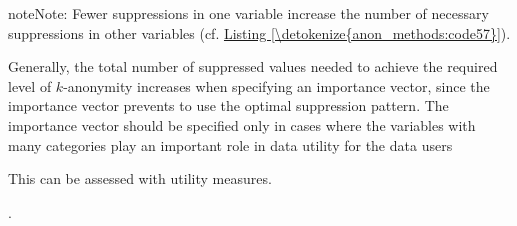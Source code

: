\documentclass[letterpaper,10pt,english]{sphinxmanual}
\begin{document}
\begin{sphinxadmonition}{note}{Note:}
Fewer suppressions in one variable increase the number of necessary
suppressions in other variables (cf. \hyperref[\detokenize{anon_methods:code57}]{Listing \ref{\detokenize{anon_methods:code57}}}).
\end{sphinxadmonition}

Generally, the total number of suppressed values needed to achieve the required level
of \(k\)-anonymity increases when specifying an importance vector,
since the importance vector prevents to use the optimal suppression
pattern. The importance vector should be specified only in cases where
the variables with many categories play an important role in data
utility for the data users %
\begin{footnote}[7]\sphinxAtStartFootnote
This can be assessed with utility measures.
%
\end{footnote}.
\end{document}
